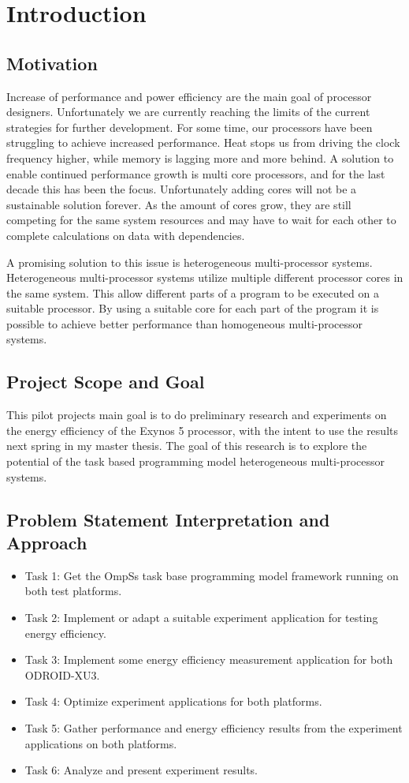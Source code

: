 \chapter[Introduction]{Introduction}
\section{Motivation}
Increase of performance and power efficiency are the main goal of processor designers.
Unfortunately we are currently reaching the limits of the current strategies for further development.
For some time, our processors have been struggling to achieve increased performance.
Heat stops us from driving the clock frequency higher, while memory is lagging more and more behind.
A solution to enable continued performance growth is multi core processors, and for the last decade this has been the focus.
Unfortunately adding cores will not be a sustainable solution forever.
As the amount of cores grow, they are still competing for the same system resources and may have to wait for each other to complete calculations on data with dependencies.

A promising solution to this issue is heterogeneous multi-processor systems.
Heterogeneous multi-processor systems utilize multiple different processor cores in the same system.
This allow different parts of a program to be executed on a suitable processor.
By using a suitable core for each part of the program it is possible to achieve better performance than homogeneous multi-processor systems.

\section{Project Scope and Goal}
This pilot projects main goal is to do preliminary research and experiments on the energy efficiency of the Exynos 5 processor, with the intent to use the results next spring in my master thesis.
The goal of this research is to explore the potential of the task based programming model heterogeneous multi-processor systems.

\section{Problem Statement Interpretation and Approach}
\begin{itemize}
  \item Task 1: Get the OmpSs task base programming model framework running on both test platforms.
  \item Task 2: Implement or adapt a suitable experiment application for testing energy efficiency.
  \item Task 3: Implement some energy efficiency measurement application for both ODROID-XU3.
  \item Task 4: Optimize experiment applications for both platforms.
  \item Task 5: Gather performance and energy efficiency results from the experiment applications on both platforms.
  \item Task 6: Analyze and present experiment results.
\end{itemize}

